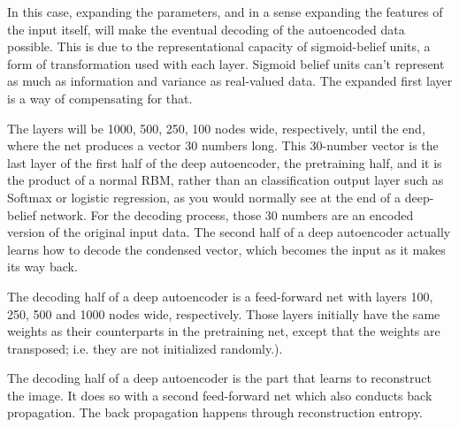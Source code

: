 	In this case, expanding the parameters, and in a sense expanding the features of the input itself, will make the eventual decoding of the autoencoded data possible.
This is due to the representational capacity of sigmoid-belief units, a form of transformation used with each layer. Sigmoid belief units can’t represent as much as information and variance as real-valued data. The expanded first layer is a way of compensating for that.

	The layers will be 1000, 500, 250, 100 nodes wide, respectively, until the end, where the net produces a vector 30 numbers long. This 30-number vector is the last layer of the first half of the deep autoencoder, the pretraining half, and it is the product of a normal RBM, rather than an classification output layer such as Softmax or logistic regression, as you would normally see at the end of a deep-belief network.
For the decoding process, those 30 numbers are an encoded version of the original input data. The second half of a deep autoencoder actually learns how to decode the condensed vector, which becomes the input as it makes its way back.

	The decoding half of a deep autoencoder is a feed-forward net with layers 100, 250, 500 and 1000 nodes wide, respectively. Those layers initially have the same weights as their counterparts in the pretraining net, except that the weights are transposed; i.e. they are not initialized randomly.).

	The decoding half of a deep autoencoder is the part that learns to reconstruct the image. It does so with a second feed-forward net which also conducts back propagation. The back propagation happens through reconstruction entropy.

